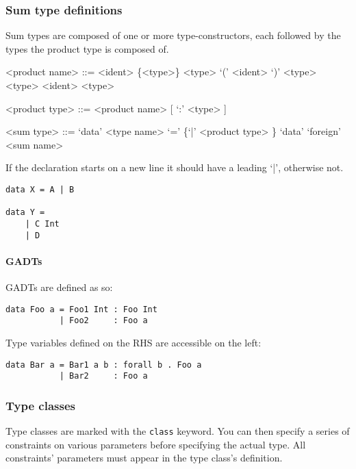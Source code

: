 \subsubsection{Sum type definitions}
Sum types are composed of one or more type-constructors, each followed by the types the product type is composed of.

\begin{grammar}
<product name> ::= <ident> \{<type>\}
              \alt <type> `(' <ident> `)' <type>
              \alt <type> \lit{\`{}} <ident> \lit{\`{}} <type>

<product type> ::= <product name>  [ `:' <type> ]

<sum type>     ::= `data' <type name> `=' \{`|' <product type> \}
              \alt `data' `foreign' <sum name>
\end{grammar}

If the declaration starts on a new line it should have a leading `|', otherwise not.

\begin{verbatim}
data X = A | B

data Y = 
    | C Int
    | D 
\end{verbatim}

\paragraph{GADTs}
GADTs are defined as so:

\begin{verbatim}
data Foo a = Foo1 Int : Foo Int
           | Foo2     : Foo a
\end{verbatim}

Type variables defined on the RHS are accessible on the left:

\begin{verbatim}
data Bar a = Bar1 a b : forall b . Foo a
           | Bar2     : Foo a
\end{verbatim}

\subsubsection{Type classes}
Type classes are marked with the \texttt{class} keyword. You can then specify a series of constraints on various parameters before specifying the actual type. All constraints’ parameters must appear in the type class’s definition.

